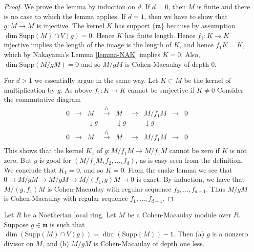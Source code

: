 \begin{proof}
We prove the lemma by induction on $d$.
If $d = 0$, then $M$ is finite and there is no case
to which the lemma applies.
If $d = 1$, then we have to show that $g : M \to M$ is
injective. The kernel $K$ has support $\{\mathfrak m\}$
because by assumption $\dim \text{Supp}(M) \cap V(g) = 0$.
Hence $K$ has finite length. Hence $f_1 : K \to K$ injective
implies the length of the image is the length of $K$, and hence
$f_1 K = K$, which by Nakayama's Lemma \ref{lemma-NAK} implies $K = 0$.
Also, $\dim \text{Supp}(M/gM) = 0$ and so $M/gM$ is Cohen-Macaulay
of depth $0$.

\medskip\noindent
For $d > 1$ we essentially argue in the same way. Let $K \subset M$
be the kernel of multiplication by $g$. As above $f_1 : K \to K$
cannot be surjective if $K \not= 0$
Consider the commutative diagram
$$
\begin{matrix}
0 & \to & M & \xrightarrow{f_1} & M & \to & M/f_1M & \to & 0 \\
& & \downarrow{g} & & \downarrow{g} & & \downarrow{g} && \\
0 & \to & M & \xrightarrow{f_1} & M & \to & M/f_1M & \to & 0 \\
\end{matrix}
$$
This shows that the kernel $K_1$ of $g : M/f_1M \to M/f_1M$
cannot be zero if $K$ is not zero. But $g$ is good for
$(M/f_1M, f_2,\ldots,f_d)$, as is easy seen from the definition.
We conclude that $K_1 = 0$, and so $K = 0$. From the snake
lemma we see that
$0 \to M/gM \to M/gM \to M/(f_1, g)M \to 0$
is exact. By induction, we have that $M/(g, f_1)M$
is Cohen-Macaulay with regular sequence $f_2,\ldots,f_{d-1}$.
Thus $M/gM$ is Cohen-Macaulay with regular sequence $f_1,\ldots,f_{d-1}$.
\end{proof}

\begin{lemma}
\label{lemma-CM-one-g}
Let $R$ be a Noetherian local ring.
Let $M$ be a Cohen-Macaulay module over $R$.
Suppose $g \in \mathfrak m$ is such that $\dim(\text{Supp}(M) \cap V(g))
= \dim(\text{Supp}(M)) - 1$. Then (a) $g$ is a nonzero divisor on $M$,
and (b) $M/gM$ is Cohen-Macaulay of depth one less.
\end{lemma}


